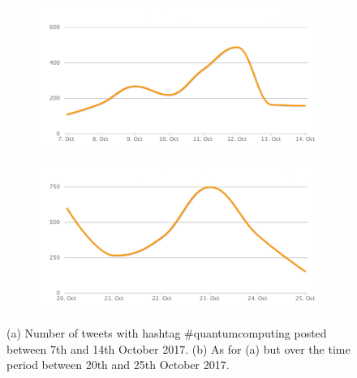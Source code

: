 \begin{figure}
 \centering
 \begin{subfigure}[b]{0.9\textwidth}
   \includegraphics[width=1\linewidth]{Images/FirstSearch_QuantumComputing.png}
   \caption{} 
 \end{subfigure}

 \begin{subfigure}[b]{0.9\textwidth}
   \includegraphics[width=1\linewidth]{Images/SecondSearch_QuantumComputing.png}
   \caption{}
 \end{subfigure}
 \caption{(a) Number of tweets with hashtag \#quantumcomputing posted between 7th and 14th October 2017. (b) As for (a) but over the time period between 20th and 25th October 2017.} 
 \label{First-SecondSearch_QuantumComputing.png}
\end{figure}

